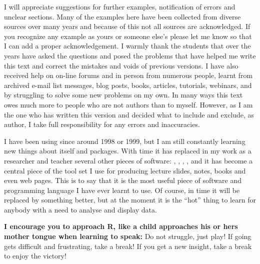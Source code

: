 I will appreciate suggestions for further examples, notification of errors and unclear sections. Many of the examples here have been collected from diverse sources over many years and because of this not all sources are acknowledged. If you recognize any example as yours or someone else's please let me know so that I can add a proper acknowledgement. I warmly thank the students that over the years have asked the questions and posed the problems that have helped me write this text and correct the mistakes and voids of previous versions. I have also received help on on-line forums and in person from numerous people, learnt from archived e-mail list messages, blog posts, books, articles, tutorials, webinars, and by struggling to solve some new problems on my own. In many ways this text owes much more to people who are not authors than to myself. However, as I am the one who has written this version and decided what to include and exclude, as author, I take full responsibility for any errors and inaccuracies.

I have been using \Rpgrm since around 1998 or 1999, but I am still constantly learning new things about \Rpgrm itself and \Rpgrm packages. With time it has replaced in my work as a researcher and teacher several other pieces of software: , , , , and it has become a central piece of the tool set I use for producing lecture slides, notes, books and even web pages. This is to say that it is the most useful piece of software and programming language I have ever learnt to use. Of course, in time it will be replaced by something better, but at the moment it is the ``hot'' thing to learn for anybody with a need to analyse and display data.

\begin{framed}
\noindent\large%
\textbf{I encourage you to approach R, like a child approaches his or hers mother tongue when learning to speak:} Do not struggle, just play! If going gets difficult and frustrating, take a break! If you get a new insight, take a break to enjoy the victory!
\end{framed}

\newpage

